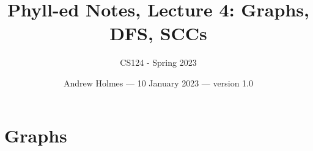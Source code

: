 \documentclass{article}
\begin{document}
\title{Phyll-ed Notes, Lecture 4: Graphs, DFS, SCCs}
\author{CS124 - Spring 2023}
\date{Andrew Holmes --- 10 January 2023 --- version 1.0}
\maketitle

\tableofcontents



\newpage
\section{Graphs}
\end{document}
